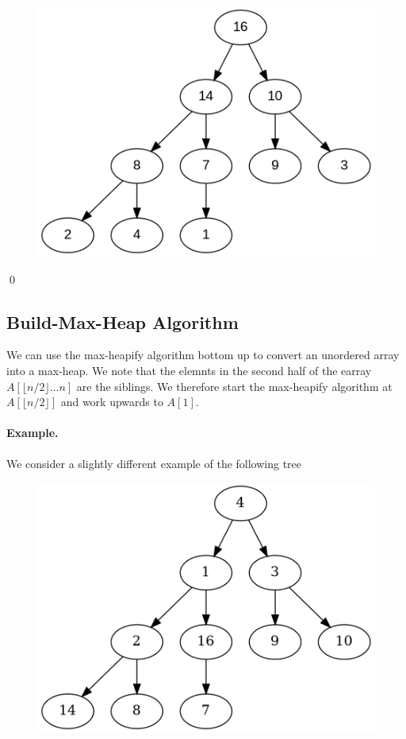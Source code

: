 \begin{figure}[H]
\centering
\includegraphics[scale=0.5]{images/heapsort_4.png}
\end{figure}

\qed


\subsection{Build-Max-Heap Algorithm}

We can use the max-heapify algorithm bottom up to convert an unordered array into a max-heap. We note that the elemnts in the second half of the earray $A[\lfloor n/2 \rfloor \ldots n]$ are the siblings. We therefore start the max-heapify algorithm at $A[\lfloor n/2 \rfloor]$ and work upwards to $A[1]$.

\paragraph{Example.} We consider a slightly different example of the following tree

\begin{figure}[H]
\centering
\includegraphics[scale=0.5]{images/heapsort_10.png}
\end{figure}

